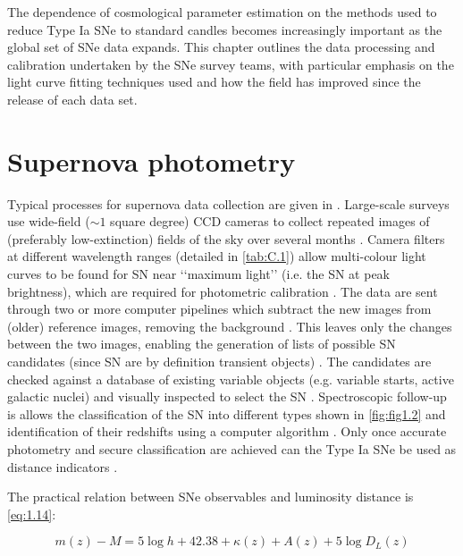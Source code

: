 The dependence of cosmological parameter estimation on the methods used to reduce Type Ia SNe to standard candles becomes increasingly important as the global set of SNe data expands. This chapter outlines the data processing and calibration undertaken by the SNe survey teams, with particular emphasis on the light curve fitting techniques used and how the field has improved since the release of each data set.

\section{Supernova photometry}
\label{sec:C.1}

Typical processes for supernova data collection are given in \cite{Kowalski2008,Hicken2009,Guy2005,Rubin2008}. 
Large-scale surveys use wide-field ($\sim 1$ square degree) CCD cameras to collect repeated images of (preferably low-extinction) fields of the sky over several months \cite{Riess2007}. Camera filters at different wavelength ranges (detailed in \cref{tab:C.1}) allow multi-colour light curves to be found for SN near \lq\lq{}maximum light\rq\rq{} (i.e. the SN at peak brightness), which are required for photometric calibration \cite{Lidman2010b}. 
The data are sent through two or more computer pipelines which subtract the new images from (older) reference images, removing the background \cite{Guy2010}. 
This leaves only the changes between the two images, enabling the generation of lists of possible SN candidates (since SN are by definition transient objects) \cite{Leibundgut2008}. The candidates are checked against a database of existing variable objects (e.g. variable starts, active galactic nuclei) and visually inspected to select the SN \cite{Guy2010}. 
Spectroscopic follow-up is allows the classification of the SN into different types shown in \cref{fig:fig1.2} and identification of their redshifts using a computer algorithm \cite{Riess2007}. Only once accurate photometry and secure classification are achieved can the Type Ia SNe be used as distance indicators \cite{Leibundgut2009}.

The practical relation between SNe observables and luminosity distance is \cref{eq:1.14}:

\begin{equation}
    m(z) - M
    = 5 \log h + 42.38 + \kappa(z) + A(z) + 5 \log D_{L}(z)
\label{eq:sn-distance-modulus}
\end{equation}


